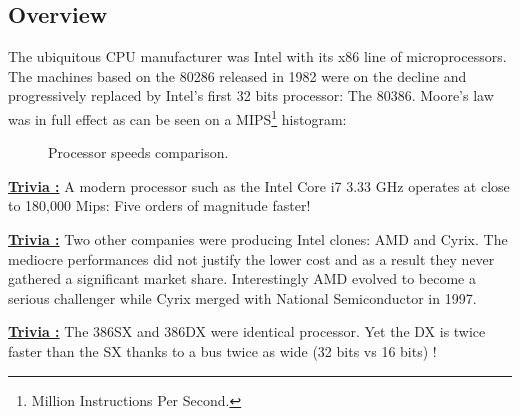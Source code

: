 \documentclass[book.tex]{subfiles}
\begin{document}
  \subsection{Overview}
  The ubiquitous CPU manufacturer was Intel with its x86 line of microprocessors.  The machines based on the 80286 released in 1982 were on the decline and progressively replaced by Intel's first 32 bits processor: The 80386. Moore's law was in full effect as can be seen on a MIPS\footnote{Million Instructions Per Second.} histogram:




\begin{figure}[H]
\centering
   \caption{Processor speeds comparison.} \label{fig:mips}
 \end{figure}

 \textbf{\underline{Trivia :}} A modern processor such as the Intel Core i7 3.33 GHz operates at close to 180,000 Mips: Five orders of magnitude faster!

 \bigskip

\textbf{\underline{Trivia :}}  Two other companies were producing Intel clones: AMD and Cyrix. The mediocre performances did not justify the lower cost and as a result they never gathered a significant market share. Interestingly AMD evolved to become a serious challenger while Cyrix merged with National Semiconductor in 1997.

 \bigskip
 
 \textbf{\underline{Trivia :}} The 386SX and 386DX were identical processor. Yet the DX is twice faster than the SX thanks to a bus twice as wide (32 bits vs 16 bits) !
\end{document}
